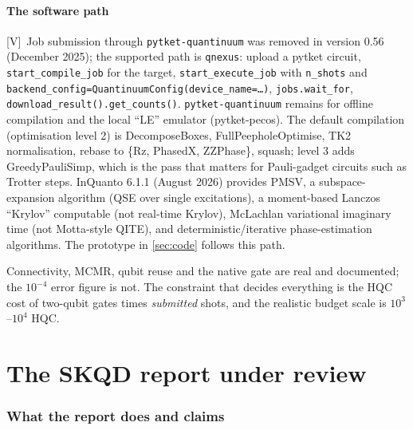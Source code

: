 \documentclass[11pt,a4paper]{article}
\newcommand{\lV}{\textcolor{keyblue}{[V]}}   %
\newcommand{\takeaway}[1]{\par\smallskip\noindent{\bfseries\textcolor{keyblue}{Takeaway.}} #1\par\smallskip}
\begin{document}
\subsection{The software path}
{\sloppy \lV\ Job submission through \texttt{pytket-quantinuum} was removed in version 0.56 (December 2025); the supported path is \texttt{qnexus}: upload a pytket circuit, \texttt{start\_compile\_job} for the target, \texttt{start\_execute\_job} with \texttt{n\_shots} and \texttt{backend\_config=QuantinuumConfig(device\_name=\ldots)}, \texttt{jobs.wait\_for}, \texttt{download\_result().get\_counts()}. \texttt{pytket-quantinuum} remains for offline compilation and the local ``LE'' emulator (pytket-pecos). The default compilation (optimisation level 2) is DecomposeBoxes, FullPeepholeOptimise, TK2 normalisation, rebase to \{Rz, PhasedX, ZZPhase\}, squash; level 3 adds GreedyPauliSimp, which is the pass that matters for Pauli-gadget circuits such as Trotter steps. InQuanto 6.1.1 (August 2026) provides PMSV, a subspace-expansion algorithm (QSE over single excitations), a moment-based Lanczos ``Krylov'' computable (not real-time Krylov), McLachlan variational imaginary time (not Motta-style QITE), and deterministic/iterative phase-estimation algorithms. The prototype in \cref{sec:code} follows this path.\par}

\takeaway{Connectivity, MCMR, qubit reuse and the native gate are real and documented; the $10^{-4}$ error figure is not. The constraint that decides everything is the HQC cost of two-qubit gates times \emph{submitted} shots, and the realistic budget scale is $10^3$--$10^4$ HQC.}

\clearpage
\part{The SKQD report under review}

\section{What the report does and claims}\label{sec:summary}
\end{document}
